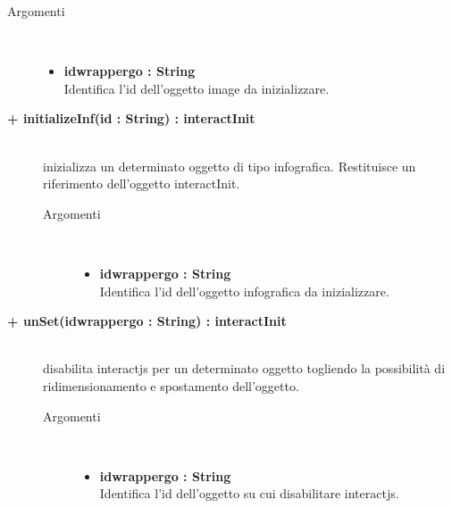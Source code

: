 \begin{description}
\begin{description}
		\begin{description}
			\item[Argomenti] \hfill \\
				\begin{itemize}
				
					\item \textbf{idwrappergo : String			} \hfill \\
						Identifica l'id dell'oggetto image da inizializzare.
					
				\end{itemize}
		\end{description}
	\end{description}
	
\begin{description}
		\item[\textbf{\color{blue}+ initializeInf(id : String) : interactInit			}] \hfill \\
			inizializza un determinato oggetto di tipo infografica. Restituisce un riferimento dell'oggetto interactInit.
			
		\begin{description}
			\item[Argomenti] \hfill \\
				\begin{itemize}
				
					\item \textbf{idwrappergo : String			} \hfill \\
						Identifica l'id dell'oggetto infografica da inizializzare.
					
				\end{itemize}
		\end{description}
	\end{description}

\begin{description}
		\item[\textbf{\color{blue}+ unSet(idwrappergo : String) : interactInit			}] \hfill \\
			disabilita interactjs per un determinato oggetto togliendo la possibilità di ridimensionamento e spostamento dell'oggetto.
			
		\begin{description}
			\item[Argomenti] \hfill \\
				\begin{itemize}
				
					\item \textbf{idwrappergo : String			} \hfill \\
						Identifica l'id dell'oggetto su cui disabilitare interactjs.
					
				\end{itemize}
		\end{description}
	\end{description}
		
	
	
	
\end{description}

